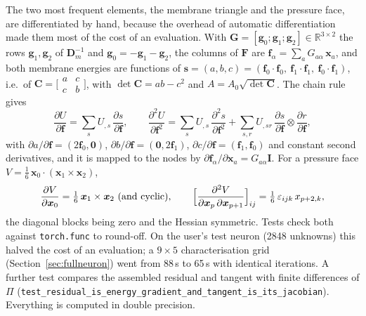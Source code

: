 \documentclass[11pt,a4paper]{article}
\newcommand{\vect}[1]{\bm{#1}}
\newcommand{\x}{\vect{x}}
\newcommand{\I}{\mathbf{I}}
\newcommand{\code}[1]{\texttt{#1}}
\theoremstyle{remark}
\begin{document}
The two most frequent elements, the membrane triangle and the pressure face, are differentiated
by hand, because the overhead of automatic differentiation made them most of the cost of an
evaluation. With $\mathbf{G}=[\vect{g}_0;\vect{g}_1;\vect{g}_2]\in\mathbb{R}^{3\times2}$ the rows
$\vect{g}_1,\vect{g}_2$ of $\mathbf{D}_m^{-1}$ and $\vect{g}_0=-\vect{g}_1-\vect{g}_2$, the columns of
$\mathbf{F}$ are $\vect{f}_\alpha = \sum_a G_{a\alpha}\,\x_a$, and both membrane energies are
functions of $\vect{s}=(a,b,c)=(\vect{f}_0\cdot\vect{f}_0,\ \vect{f}_1\cdot\vect{f}_1,\
\vect{f}_0\cdot\vect{f}_1)$, i.e.\ of $\mathbf{C}=\bigl[\begin{smallmatrix}a&c\\c&b\end{smallmatrix}\bigr]$,
with $\det\mathbf{C}=ab-c^2$ and $A=A_0\sqrt{\det\mathbf{C}}$. The chain rule gives
\begin{equation}
\frac{\partial U}{\partial\vect{f}} = \sum_s U_{,s}\,\frac{\partial s}{\partial\vect{f}},\qquad
\frac{\partial^2 U}{\partial\vect{f}^2} = \sum_s U_{,s}\,\frac{\partial^2 s}{\partial\vect{f}^2}
+ \sum_{s,r} U_{,sr}\,\frac{\partial s}{\partial\vect{f}}\otimes\frac{\partial r}{\partial\vect{f}},
\end{equation}
with $\partial a/\partial\vect{f}=(2\vect{f}_0,\vect{0})$, $\partial b/\partial\vect{f}=(\vect{0},2\vect{f}_1)$,
$\partial c/\partial\vect{f}=(\vect{f}_1,\vect{f}_0)$ and constant second derivatives, and it is
mapped to the nodes by $\partial\vect{f}_\alpha/\partial\x_a = G_{a\alpha}\I$. For a pressure face
$V=\tfrac16\,\x_0\cdot(\x_1\times\x_2)$,
\begin{equation}
\frac{\partial V}{\partial\x_0} = \tfrac16\,\x_1\times\x_2 \ \text{(and cyclic)},\qquad
\Bigl[\frac{\partial^2 V}{\partial\x_p\,\partial\x_{p+1}}\Bigr]_{ij} = \tfrac16\,\varepsilon_{ijk}\,x_{p+2,k},
\end{equation}
the diagonal blocks being zero and the Hessian symmetric. Tests check both against
\code{torch.func} to round-off. On the user's test neuron (2848 unknowns) this halved the cost of an
evaluation; a $9\times5$ characterisation grid (Section~\ref{sec:fullneuron}) went from 88\,s to
65\,s with identical iterations. A further test compares the assembled residual and tangent with
finite differences of $\Pi$
(\code{test\_residual\_is\_energy\_gradient\_and\_tangent\_is\_its\_jacobian}). Everything is
computed in double precision.
\end{document}

